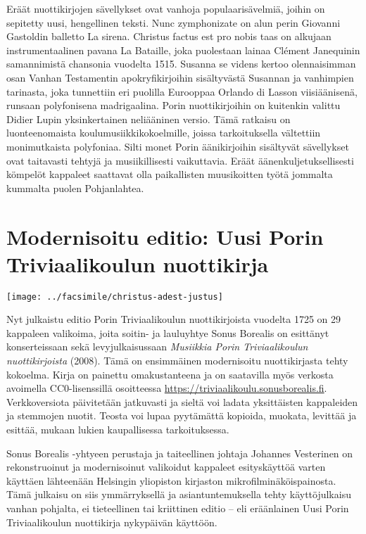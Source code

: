 Eräät nuottikirjojen sävellykset ovat vanhoja populaarisävelmiä, joihin on sepitetty uusi, hengellinen teksti. Nunc zymphonizate on alun perin Giovanni Gastoldin balletto La sirena. Christus factus est pro nobis taas on alkujaan instrumentaalinen pavana La Bataille, joka puolestaan lainaa Clément Janequinin samannimistä chansonia vuodelta 1515. Susanna se videns kertoo olennaisimman osan Vanhan Testamentin apokryfikirjoihin sisältyvästä Susannan ja vanhimpien tarinasta, joka tunnettiin eri puolilla Eurooppaa Orlando di Lasson viisiäänisenä, runsaan polyfonisena madrigaalina. Porin nuottikirjoihin on kuitenkin valittu Didier Lupin yksinkertainen neliääninen versio. Tämä ratkaisu on luonteenomaista koulumusiikkikokoelmille, joissa tarkoituksella vältettiin monimutkaista polyfoniaa. Silti monet Porin äänikirjoihin sisältyvät sävellykset ovat taitavasti tehtyjä ja musiikillisesti vaikuttavia. Eräät äänenkuljetuksellisesti kömpelöt kappaleet saattavat olla paikallisten muusikoitten työtä jommalta kummalta puolen Pohjanlahtea.

\section*{Modernisoitu editio: Uusi Porin Triviaalikoulun nuottikirja}

\texttt{[image: ../facsimile/christus-adest-justus]}

Nyt julkaistu editio Porin Triviaalikoulun nuottikirjoista vuodelta 1725 on 29 kappaleen valikoima, joita soitin- ja lauluyhtye Sonus Borealis on esittänyt konserteissaan sekä levyjulkaisussaan \textit{Musiikkia Porin Triviaalikoulun nuottikirjoista} (2008). Tämä on ensimmäinen modernisoitu nuottikirjasta tehty kokoelma. Kirja on painettu omakustanteena ja on saatavilla myös verkosta avoimella CC0-lisenssillä osoitteessa \url{https://triviaalikoulu.sonusborealis.fi}. Verkkoversiota päivitetään jatkuvasti ja sieltä voi ladata yksittäisten kappaleiden ja stemmojen nuotit. Teosta voi lupaa pyytämättä kopioida, muokata, levittää ja esittää, mukaan lukien kaupallisessa tarkoituksessa.

Sonus Borealis -yhtyeen perustaja ja taiteellinen johtaja Johannes Vesterinen on rekonstruoinut ja modernisoinut valikoidut kappaleet esityskäyttöä varten käyttäen lähteenään Helsingin yliopiston kirjaston mikrofilminäköispainosta. Tämä julkaisu on siis ymmärryksellä ja asiantuntemuksella tehty käyttöjulkaisu vanhan pohjalta, ei tieteellinen tai kriittinen editio -- eli eräänlainen Uusi Porin Triviaalikoulun nuottikirja nykypäivän käyttöön.

